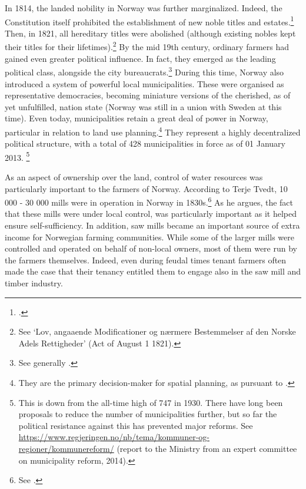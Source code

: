In 1814, the landed nobility in Norway was further marginalized. Indeed, the Constitution itself prohibited the establishment of new noble titles and estates.\footcite[23|118]{c14} Then, in 1821, all hereditary titles were abolished (although existing nobles kept their titles for their lifetimes).\footnote{See `Lov, angaaende Modificationer og nærmere Bestemmelser af den Norske Adels Rettigheder' (Act of August 1 1821).} By the mid 19th century, ordinary farmers had gained even greater political influence. In fact, they emerged as the leading political class, alongside the city bureaucrats.\footnote{See generally \cite{hommerstad14}.} During this time, Norway also introduced a system of powerful local municipalities. These were organised as representative democracies, becoming miniature versions of the cherished, as of yet unfulfilled, nation state (Norway was still in a union with Sweden at this time). Even today, municipalities retain a great deal of power in Norway, particular in relation to land use planning.\footnote{They are the primary decision-maker for spatial planning, as pursuant to \cite{pb08}.} They represent a highly decentralized political structure, with a total of 428 municipalities in force as of 01 January 2013. \footnote{This is down from the all-time high of 747 in 1930. There have long been proposals to reduce the number of municipalities further, but so far the political resistance against this has prevented major reforms. See \url{https://www.regjeringen.no/nb/tema/kommuner-og-regioner/kommunereform/} (report to the Ministry from an expert committee on municipality reform, 2014).}

As an aspect of ownership over the land, control of water resources was particularly important to the farmers of Norway. According to Terje Tvedt, 10 000 - 30 000 mills were in operation in Norway in 1830s.\footnote{See \cite[121]{tvedt13}.} As he argues, the fact that these mills were under local control, was particularly important as it helped ensure self-sufficiency. In addition, saw mills became an important source of extra income for Norwegian farming communities. While some of the larger mills were controlled and operated on behalf of non-local owners, most of them were run by the farmers themselves. Indeed, even during feudal times tenant farmers often made the case that their tenancy entitled them to engage also in the saw mill and timber industry.

